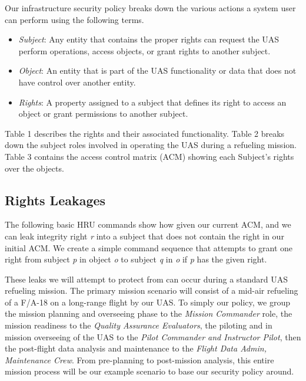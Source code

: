 \documentclass[10pt,journal,compsoc]{IEEEtran}
\begin{document}
  Our infrastructure security policy breaks down the various actions a system user can perform using the following terms. 

  \begin{itemize}
    \item \textit{Subject}: Any entity that contains the proper rights can request the UAS perform operations, access objects, or grant rights to another subject.
    \item \textit{Object}: An entity that is part of the UAS functionality or data that does not have control over another entity. 
    \item \textit{Rights}: A property assigned to a subject that defines its right to access an object or grant permissions to another subject.
  \end{itemize}
  
  Table 1 describes the rights and their associated functionality. Table 2 breaks down the subject roles involved in operating the UAS during a refueling mission. Table 3 contains the access control matrix (ACM) showing each Subject's rights over the objects.
  
  \subsection{Rights Leakages}
  
  The following basic HRU commands show how given our current ACM, and we can leak integrity right \textit{r} into a subject that does not contain the right in our initial ACM.
  We create a simple command sequence that attempts to grant one right from subject \textit{p} in object \textit{o} to subject \textit{q} in \textit{o} if \textit{p} has the given right.

  These leaks we will attempt to protect from can occur during a standard UAS refueling mission. The primary mission scenario will consist of a mid-air refueling of a F/A-18 on a long-range flight by our UAS. To simply our policy, we group the mission planning and overseeing phase to the \textit{Mission Commander} role, the mission readiness to the \textit{Quality Assurance Evaluators}, the piloting and in mission overseeing of the UAS to the \textit{Pilot Commander and Instructor Pilot}, then the post-flight data analysis and maintenance to the \textit{Flight Data Admin, Maintenance Crew}. From pre-planning to post-mission analysis, this entire mission process will be our example scenario to base our security policy around. 
  
\end{document}
